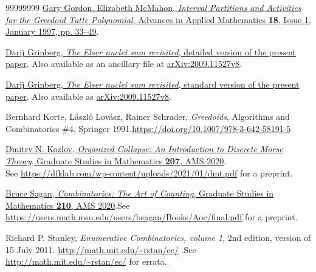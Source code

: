 \documentclass[numbers=enddot,12pt,final,onecolumn]{scrartcl}%
\theoremstyle{definition}
\newenvironment{verlong}{}{}
\newenvironment{vershort}{}{}
\begin{document}
\begin{thebibliography}{99999999}
\href{https://doi.org/10.1006/aama.1996.0495}{Gary
Gordon, Elizabeth McMahon, \textit{Interval Partitions and Activities for the
Greedoid Tutte Polynomial}, Advances in Applied Mathematics \textbf{18}, Issue
1, January 1997, pp. 33--49}.

\begin{vershort}


%
\href{http://www.cip.ifi.lmu.de/~grinberg/algebra/elsersum-long.pdf}{Darij
Grinberg, \textit{The Elser nuclei sum revisited}, detailed version of the
present paper}. Also available as an ancillary file at
\href{http://arxiv.org/abs/2009.11527v8}{arXiv:2009.11527v8}.
\end{vershort}

\begin{verlong}


%
\href{http://www.cip.ifi.lmu.de/~grinberg/algebra/elsersum.pdf}{Darij
Grinberg, \textit{The Elser nuclei sum revisited}, standard version of the
present paper}. Also available as
\href{http://arxiv.org/abs/2009.11527v8}{arXiv:2009.11527v8}.
\end{verlong}

Bernhard Korte, L\'{a}szl\'{o} Lov\'{a}sz, Rainer
Schrader, \textit{Greedoids}, Algorithms and Combinatorics \#4, Springer
1991.\newline\url{https://doi.org/10.1007/978-3-642-58191-5}

\href{https://bookstore.ams.org/gsm-207}{Dmitry N.
Kozlov, \textit{Organized Collapse: An Introduction to Discrete Morse Theory},
Graduate Studies in Mathematics \textbf{207}, AMS 2020}. \\
See \url{https://dfklab.com/wp-content/uploads/2021/01/dmt.pdf} for a preprint.

\href{https://bookstore.ams.org/gsm-210/}{Bruce
Sagan, \textit{Combinatorics: The Art of Counting}, Graduate Studies in
Mathematics \textbf{210}, AMS 2020}.\newline See
\url{https://users.math.msu.edu/users/bsagan/Books/Aoc/final.pdf} for a preprint.

Richard P. Stanley, \textit{Enumerative
Combinatorics, volume 1}, 2nd edition, version of 15 July 2011.\newline%
\url{http://math.mit.edu/~rstan/ec/} .\newline See
\url{http://math.mit.edu/~rstan/ec/} for errata.
\end{thebibliography}
\end{document}

